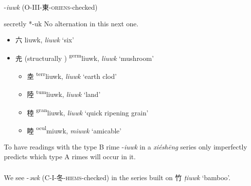 -\textit{iuwk} (O-III-東-\textsc{oriens}-checked)

secretly *-uk 
No alternation in this next one. 
    

\begin{itemize}
    \item {\Large{六}} %
    {\large{liuwk}},
    \textit{liuwk} `six' %

    \item {\Large{圥}} (structurally {\Large{}})     {\large{{\textsuperscript{germ}}liuwk}}, \textit{liuwk}
    `mushroom'

\begin{itemize}
    \item {\Large{坴}} %
    {\large{{\textsuperscript{terr}}liuwk}},
    \textit{liuwk} `earth clod' %


    \item {\Large{陸}} %
    {\large{{\textsuperscript{tum}}liuwk}},
    \textit{liuwk} `land' %

    \item {\Large{稑}} %
    {\large{{\textsuperscript{gran}}liuwk}},
    \textit{liuwk} `quick ripening grain' %

    \item {\Large{睦}} %
    {\large{{\textsuperscript{ocul}}miuwk}},
    \textit{miuwk} `amicable' %
\end{itemize}
\end{itemize}

To have readings with the type B rime -\textit{iuwk} in 
a  \textit{xiéshēng}  series only imperfectly predicts which type A rimes will occur in it. 

\subparagraph{}
We see 
-\textit{əwk} (C-I-冬-\textsc{hiems}-checked) in the series built on 竹 \textit{ṭiuwk} `bamboo'. 


